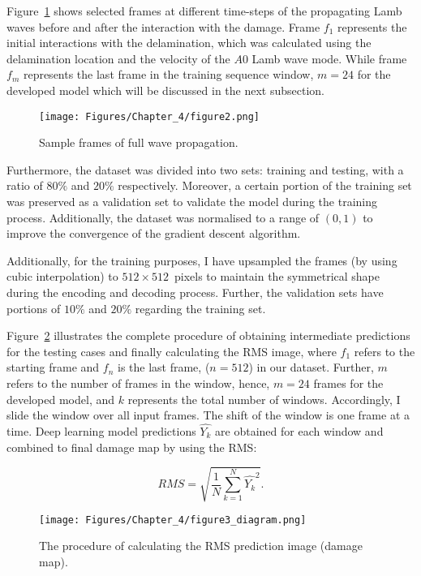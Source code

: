 Figure~\ref{fig:Full_wave} shows selected frames at different time-steps of the propagating Lamb waves before and after the interaction with the damage.
Frame \(f_{1}\) represents the initial interactions with the delamination, which was calculated using the delamination location and the velocity of the \(A0\) Lamb wave mode.
While frame \(f_{m}\) represents the last frame in the training sequence window, \(m=24\) for the developed model which will be discussed in the next subsection.
\begin{figure}[!h]
	\centering
	\texttt{[image: Figures/Chapter\_4/figure2.png]}
	\caption{Sample frames of full wave propagation.}
	\label{fig:Full_wave}
\end{figure}

Furthermore, the dataset was divided into two sets: training and testing, with a ratio of \(80\%\) and \(20\% \) respectively.
Moreover, a certain portion of the training set was preserved as a validation set to validate the model during the training process.
Additionally, the dataset was normalised to a range of \((0, 1)\) to improve the convergence of the gradient descent algorithm.

Additionally, for the training purposes, I have upsampled the frames (by using cubic interpolation) to \(512\times512\)~pixels to maintain the symmetrical shape during the encoding and decoding process.
Further, the validation sets have portions of \(10\%\) and \(20\%\) regarding the training set.

Figure~\ref{fig:Diagram_exp_predictions} illustrates the complete procedure of obtaining intermediate predictions for the testing cases and finally calculating the RMS image, where \(f_{1}\) refers to the starting frame and \(f_{n}\) is the last frame, (\(n=512\)) in our dataset.
Further, \(m\) refers to the number of frames in the window, hence, \(m=24\) frames for the developed model, and \(k\) represents the total number of windows.
Accordingly, I slide the window over all input frames.
The shift of the window is one frame at a time.
Deep learning model predictions \(\hat{Y_k}\) are obtained for each window and combined to final damage map by using the RMS:

\begin{equation}
	RMS = \sqrt{\frac{1}{N}\sum_{k=1}^{N}\hat{Y_k}^2}.	
	\label{RMS}
\end{equation}
\begin{figure}[!h]
	\centering
	\texttt{[image: Figures/Chapter\_4/figure3\_diagram.png]}
	\caption{The procedure of calculating the RMS prediction image (damage map).}
	\label{fig:Diagram_exp_predictions}
\end{figure}
